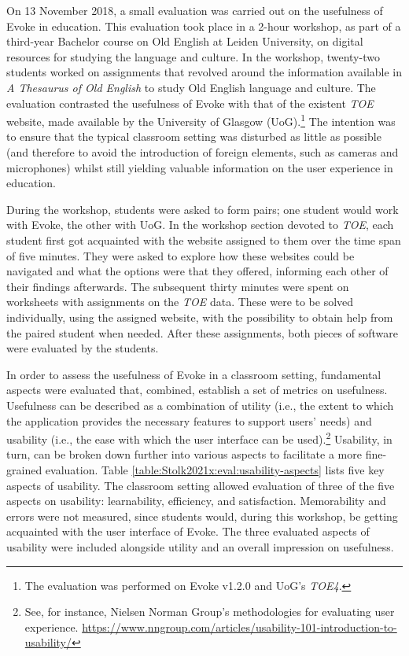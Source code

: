 On 13 November 2018, a small evaluation was carried out on the usefulness of Evoke in education. This evaluation took place in a 2-hour workshop, as part of a third-year Bachelor course on Old English at Leiden University, on digital resources for studying the language and culture. In the workshop, twenty-two students worked on assignments that revolved around the information available in \textit{A Thesaurus of Old English} to study Old English language and culture. The evaluation contrasted the usefulness of Evoke with that of the existent \textit{TOE} website, made available by the University of Glasgow (UoG).\footnote{The evaluation was performed on Evoke v1.2.0 and UoG's \textit{TOE4}.} The intention was to ensure that the typical classroom setting was disturbed as little as possible (and therefore to avoid the introduction of foreign elements, such as cameras and microphones) whilst still yielding valuable information on the user experience in education.

During the workshop, students were asked to form pairs; one student would work with Evoke, the other with UoG. In the workshop section devoted to \textit{TOE}, each student first got acquainted with the website assigned to them over the time span of five minutes. They were asked to explore how these websites could be navigated and what the options were that they offered, informing each other of their findings afterwards. The subsequent thirty minutes were spent on worksheets with assignments on the \textit{TOE} data. These were to be solved individually, using the assigned website, with the possibility to obtain help from the paired student when needed. After these assignments, both pieces of software were evaluated by the students.

In order to assess the usefulness of Evoke in a classroom setting, fundamental aspects were evaluated that, combined, establish a set of metrics on usefulness. Usefulness can be described as a combination of utility (i.e., the extent to which the application provides the necessary features to support users' needs) and usability (i.e., the ease with which the user interface can be used).\footnote{See, for instance, Nielsen Norman Group's methodologies for evaluating user experience. \url{https://www.nngroup.com/articles/usability-101-introduction-to-usability/}} Usability, in turn, can be broken down further into various aspects to facilitate a more fine-grained evaluation. Table \ref{table:Stolk2021x:eval:usability-aspects} lists five key aspects of usability. 
The classroom setting allowed evaluation of three of the five aspects on usability: learnability, efficiency, and satisfaction. Memorability and errors were not measured, since students would, during this workshop, be getting acquainted with the user interface of Evoke. The three evaluated aspects of usability were included alongside utility and an overall impression on usefulness.

